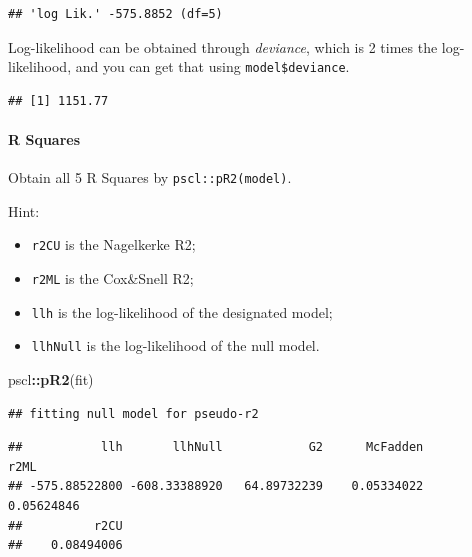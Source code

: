 \documentclass[
]{ctexart}
\newenvironment{Shaded}{\begin{snugshade}}{\end{snugshade}}
\newcommand{\FunctionTok}[1]{\textcolor[rgb]{0.13,0.29,0.53}{\textbf{#1}}}
\newcommand{\NormalTok}[1]{#1}
\newcommand{\SpecialCharTok}[1]{\textcolor[rgb]{0.81,0.36,0.00}{\textbf{#1}}}
\providecommand{\tightlist}{%
  \setlength{\itemsep}{0pt}\setlength{\parskip}{0pt}}
\begin{document}
\begin{verbatim}
## 'log Lik.' -575.8852 (df=5)
\end{verbatim}

Log-likelihood can be obtained through \emph{deviance}, which is 2 times
the log-likelihood, and you can get that using \texttt{model\$deviance}.

\begin{Shaded}
\end{Shaded}

\begin{verbatim}
## [1] 1151.77
\end{verbatim}

\hypertarget{r-squares}{%
\paragraph{R Squares}\label{r-squares}}

Obtain all 5 R Squares by \texttt{pscl::pR2(model)}.

Hint:

\begin{itemize}
\tightlist
\item
  \texttt{r2CU} is the Nagelkerke R2;
\item
  \texttt{r2ML} is the Cox\&Snell R2;
\item
  \texttt{llh} is the log-likelihood of the designated model;
\item
  \texttt{llhNull} is the log-likelihood of the null model.
\end{itemize}

\begin{Shaded}
\begin{Highlighting}[]
\NormalTok{pscl}\SpecialCharTok{::}\FunctionTok{pR2}\NormalTok{(fit)}
\end{Highlighting}
\end{Shaded}

\begin{verbatim}
## fitting null model for pseudo-r2
\end{verbatim}

\begin{verbatim}
##           llh       llhNull            G2      McFadden          r2ML 
## -575.88522800 -608.33388920   64.89732239    0.05334022    0.05624846 
##          r2CU 
##    0.08494006
\end{verbatim}
\end{document}
